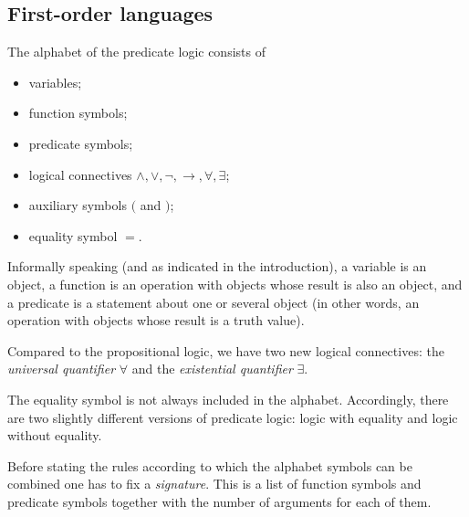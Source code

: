 \subsection{First-order languages}
The alphabet of the predicate logic consists of
\begin{itemize}
\item
variables;
\item
function symbols;
\item
predicate symbols;
\item
logical connectives $\wedge, \vee, \neg, \to, \forall, \exists$;
\item
auxiliary symbols $($ and $)$;
\item
equality symbol $=$.
\end{itemize}

Informally speaking (and as indicated in the introduction), a variable is an object,
a function is an operation with objects whose result is also an object,
and a predicate is a statement about one or several object (in other words, an operation with objects whose result is a truth value).

Compared to the propositional logic, we have two new logical connectives:
the \emph{universal quantifier} $\forall$ and the \emph{existential quantifier} $\exists$.

The equality symbol is not always included in the alphabet.
Accordingly, there are two slightly different versions of predicate logic: logic with equality and logic without equality.

Before stating the rules according to which the alphabet symbols can be combined one has to fix a \emph{signature}.
This is a list of function symbols and predicate symbols together with the number of arguments for each of them.
